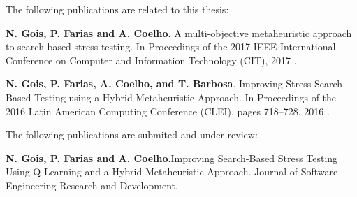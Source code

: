  

The following publications are related to this thesis:

\noindent \textbf{N. Gois, P. Farias and A. Coelho}. A multi-objective metaheuristic approach to search-based stress testing. In Proceedings of the 2017 IEEE International Conference on Computer and Information Technology (CIT), 2017 \cite{Gois2017}.

\noindent \textbf{N. Gois, P. Farias, A. Coelho, and T. Barbosa}. Improving Stress Search Based Testing using a Hybrid Metaheuristic Approach. In Proceedings of the 2016 Latin American Computing Conference (CLEI), pages 718–728, 2016 \cite{Gois2016}.


The following publications are submited and under review:

\noindent \textbf{N. Gois, P. Farias and A. Coelho}.Improving Search-Based Stress Testing Using Q-Learning and a Hybrid Metaheuristic Approach. Journal of Software Engineering Research and Development.